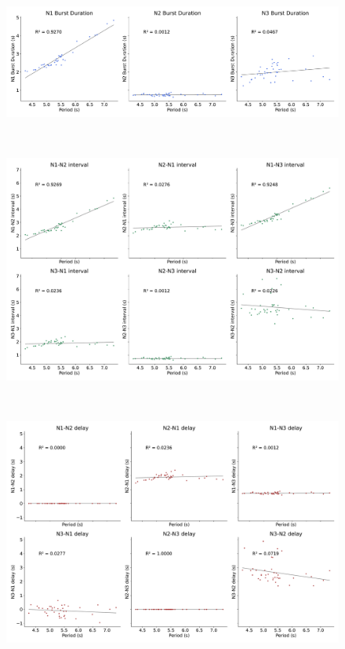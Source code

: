 \begin{figure}[htbp]
\begin{minipage}{0.9\textwidth}
\begin{minipage}[b]{0.53\textwidth}
			\centering
			\begin{minipage}[b]{\textwidth}
				\centering
				\includegraphics[width=\textwidth]{./invariants/data/SUSSEX/CV1a_driven1/images/stim_cv1a1_3phases_durations.pdf}
			\end{minipage}\\
			\begin{minipage}[b]{\textwidth}
				\centering
				\includegraphics[width=\textwidth]{./invariants/data/SUSSEX/CV1a_driven1/images/stim_cv1a1_3phases_intervals.pdf}
			\end{minipage}\\
			\begin{minipage}[b]{\textwidth}
				\centering
				\includegraphics[width=\textwidth]{./invariants/data/SUSSEX/CV1a_driven1/images/stim_cv1a1_3phases_delays.pdf}

\end{minipage}
\end{minipage}
\end{minipage}
\end{figure}
